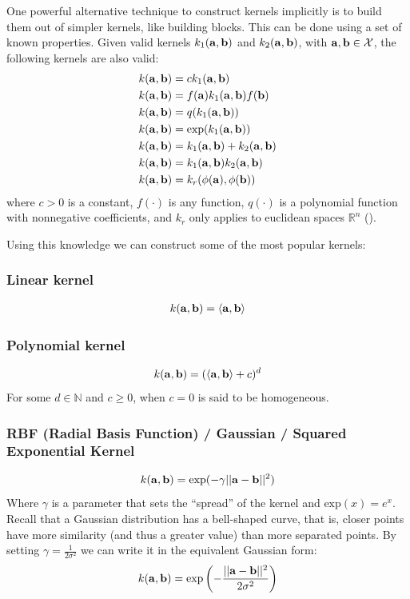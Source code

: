 One powerful alternative technique to construct kernels implicitly is to build them out of simpler kernels, like building blocks. This can be done using a set of known properties. Given valid kernels $k_1(\mathbf{a}, \mathbf{b})$ and $k_2(\mathbf{a}, \mathbf{b})$, with $\mathbf{a}, \mathbf{b} \in \mathcal{X}$, the following kernels are also valid:
\begin{align}
    k(\mathbf{a}, \mathbf{b}) &= c k_1(\mathbf{a}, \mathbf{b})\\
    k(\mathbf{a}, \mathbf{b}) &= f(\mathbf{a}) k_1(\mathbf{a}, \mathbf{b}) f(\mathbf{b})\\
    k(\mathbf{a}, \mathbf{b}) &= q(k_1(\mathbf{a}, \mathbf{b}))\\
    k(\mathbf{a}, \mathbf{b}) &= \text{exp}(k_1(\mathbf{a}, \mathbf{b}))\\
    k(\mathbf{a}, \mathbf{b}) &= k_1(\mathbf{a}, \mathbf{b}) + k_2(\mathbf{a}, \mathbf{b})\\
    k(\mathbf{a}, \mathbf{b}) &= k_1(\mathbf{a}, \mathbf{b}) k_2(\mathbf{a}, \mathbf{b})\\
    k(\mathbf{a}, \mathbf{b}) &= k_{r}(\phi(\mathbf{a}), \phi(\mathbf{b}))
\end{align} 
where $c > 0$ is a constant, $f(\cdot)$ is any function, $q(\cdot)$ is a polynomial function with nonnegative coefficients, and $k_r$ only applies to euclidean spaces $\mathbb{R}^n$ (\cite{bishop_pattern_2006}).

Using this knowledge we can construct some of the most popular kernels:

\subsubsection*{Linear kernel}
\begin{align}
    k(\mathbf{a}, \mathbf{b}) = \langle\mathbf{a}, \mathbf{b}\rangle
\end{align}

\subsubsection*{Polynomial kernel}
\begin{align}
    k(\mathbf{a}, \mathbf{b}) = (\langle\mathbf{a}, \mathbf{b}\rangle + c)^d
\end{align}
For some $d \in \mathbb{N}$ and $c \ge 0$, when $c = 0$ is said to be homogeneous.

\subsubsection*{RBF (Radial Basis Function) / Gaussian / Squared Exponential Kernel}
\begin{align}
    k(\mathbf{a}, \mathbf{b}) = \text{exp}(-\gamma ||\mathbf{a} - \mathbf{b}||^2)
\end{align}
Where $\gamma$ is a parameter that sets the “spread” of the kernel and $\text{exp}(x) = e^x$. Recall that a Gaussian distribution has a bell-shaped curve, that is, closer points have more similarity (and thus a greater value) than more separated points. By setting $\gamma = \frac{1}{2\sigma^2}$ we can write it in the equivalent Gaussian form:
\begin{align}
    k(\mathbf{a}, \mathbf{b}) = \text{exp}\left(-\frac{||\mathbf{a} - \mathbf{b}||^2}{2\sigma^2}\right)
\end{align}


